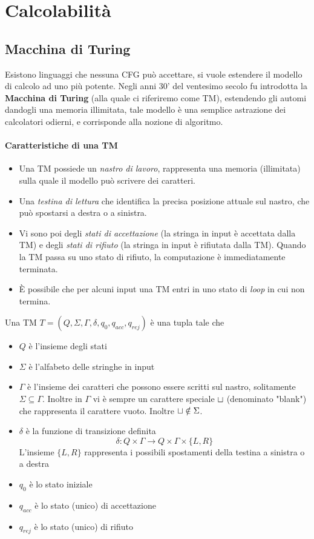 \documentclass[10pt, letterpaper]{report}
\begin{document}
\chapter{Calcolabilità}
\section{Macchina di Turing}
Esistono linguaggi che nessuna CFG può accettare, si vuole estendere il modello di calcolo ad uno più 
potente. Negli anni 30' del ventesimo secolo fu introdotta la \textbf{Macchina di Turing} (alla quale ci 
riferiremo come TM), estendendo gli automi dandogli una memoria illimitata, tale modello è una semplice 
astrazione dei calcolatori odierni, e corrisponde alla nozione di algoritmo.\subsubsection{Caratteristiche di una TM}\begin{itemize}
    \item Una TM possiede un \textit{nastro di lavoro}, rappresenta una memoria (illimitata) sulla quale il modello 
    può scrivere dei caratteri. 
    \item Una \textit{testina di lettura} che identifica la precisa posizione attuale sul nastro, che può spostarsi 
    a destra o a sinistra. 
    \item Vi sono poi degli \textit{stati di accettazione} (la stringa in input è accettata dalla TM) e degli 
    \textit{stati di rifiuto} (la stringa in input è rifiutata dalla TM). Quando la TM passa su uno stato di rifiuto, 
    la computazione è immediatamente terminata. 
    \item È possibile che per alcuni input una TM entri in uno stato di \textit{loop} in cui non termina.
\end{itemize}
 Una TM $T=(Q,\Sigma,\Gamma,\delta,q_0,q_{acc},q_{rej})$ è una tupla tale che \begin{itemize}
    \item $Q$ è l'insieme degli stati 
    \item $\Sigma$ è l'alfabeto delle stringhe in input 
    \item $\Gamma$ è l'insieme dei caratteri che possono essere scritti sul nastro, solitamente $\Sigma\subseteq \Gamma$. Inoltre 
    in $\Gamma$ vi è sempre un carattere speciale ${\sqcup}$ (denominato "blank") che rappresenta il carattere vuoto.
    Inoltre ${\sqcup}\notin\Sigma$.
    \item $\delta$ è la funzione di transizione definita $$ \delta : Q\times \Gamma \rightarrow Q\times \Gamma \times \{L,R\}$$
    L'insieme $\{L,R\}$ rappresenta i possibili spostamenti della testina a sinistra o a destra
    \item $q_0$ è lo stato iniziale 
    \item  $q_{acc}$ è lo stato (unico) di accettazione 
    \item $q_{rej}$ è lo stato (unico) di rifiuto 
\end{itemize}
\end{document}
